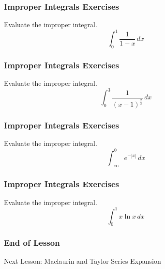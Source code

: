 \documentclass[xcolor=dvipsnames]{beamer}
\begin{document}
\begin{frame}
  \frametitle{Improper Integrals Exercises}
{\ubung} Evaluate the improper integral.
  \begin{equation}
    \label{eq:oocoibuo}
    \int_{0}^{1}\frac{1}{1-x}\,dx
  \end{equation}
\end{frame}

\begin{frame}
  \frametitle{Improper Integrals Exercises}
{\ubung} Evaluate the improper integral.
  \begin{equation}
    \label{eq:eebaesie}
    \int_{0}^{3}\frac{1}{(x-1)^{\frac{2}{3}}}\,dx
  \end{equation}
\end{frame}

\begin{frame}
  \frametitle{Improper Integrals Exercises}
{\ubung} Evaluate the improper integral.
  \begin{equation}
    \label{eq:aezihuth}
    \int_{-\infty}^{0}e^{-|x|}\,dx
  \end{equation}
\end{frame}

\begin{frame}
  \frametitle{Improper Integrals Exercises}
{\ubung} Evaluate the improper integral.
  \begin{equation}
    \label{eq:wiexohje}
    \int_{0}^{1}x\ln{}x\,dx
  \end{equation}
\end{frame}

\begin{frame}
  \frametitle{End of Lesson}
Next Lesson: Maclaurin and Taylor Series Expansion
\end{frame}
\end{document}
